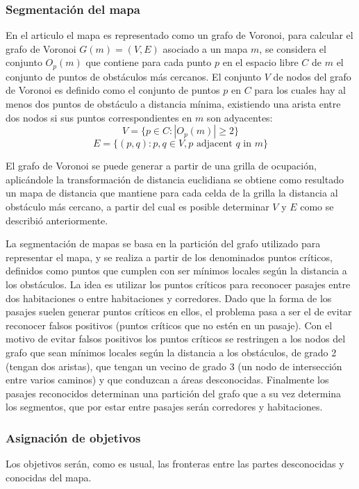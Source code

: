 \subsubsection{Segmentación del mapa}
En el articulo el mapa es representado como un grafo de Voronoi, para calcular el grafo de Voronoi $G(m) = (V, E)$ asociado a un mapa $m$, se considera el conjunto $O_p (m)$ que contiene para cada punto $p$ en el espacio libre $C$ de $m$ el conjunto de puntos de obstáculos más cercanos. El conjunto $V$ de nodos del grafo de Voronoi es definido como el conjunto de puntos $p$ en $C$ para los cuales hay al menos dos puntos de obstáculo a distancia mínima, existiendo una arista entre dos nodos si sus puntos correspondientes en $m$ son adyacentes:
\[
V = \{p \in C : |O_p (m)| \geq 2\}
\]
\[
E = \{(p, q) : p, q \in V, p \text{ adjacent } q \text{ in } m\}
\]

El grafo de Voronoi se puede generar a partir de una grilla de ocupación, aplicándole la transformación de distancia euclidiana\cite{meijster2002general} se obtiene como resultado un mapa de distancia que mantiene para cada celda de la grilla la distancia al obstáculo más cercano, a partir del cual es posible determinar $V$ y $E$ como se describió anteriormente.

La segmentación de mapas se basa en la partición del grafo utilizado para representar el mapa, y se realiza a partir de los denominados puntos críticos, definidos como puntos que cumplen con ser mínimos locales según la distancia a los obstáculos. La idea es utilizar los puntos críticos para reconocer pasajes entre dos habitaciones o entre habitaciones y corredores. Dado que la forma de los pasajes suelen generar puntos críticos en ellos, el problema pasa a ser el de evitar reconocer falsos positivos (puntos críticos que no estén en un pasaje). Con el motivo de evitar falsos positivos los puntos críticos se restringen a los nodos del grafo que sean mínimos locales según la distancia a los obstáculos, de grado 2 (tengan dos aristas), que tengan un vecino de grado 3 (un nodo de intersección entre varios caminos) y que conduzcan a áreas desconocidas.
Finalmente los pasajes reconocidos determinan una partición del grafo que a su vez determina los segmentos, que por estar entre pasajes serán corredores y habitaciones.

\subsubsection{Asignación de objetivos}
Los objetivos serán, como es usual, las fronteras entre las partes desconocidas y conocidas del mapa.

